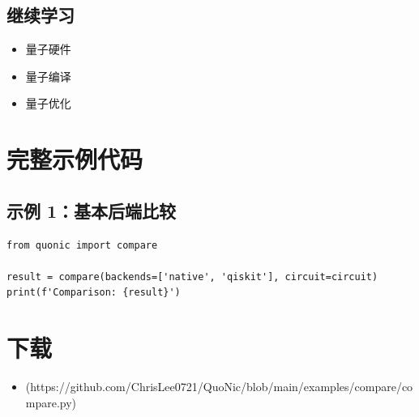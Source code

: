 \documentclass[12pt,a4paper]{article}
\begin{document}
\subsection{继续学习}
\begin{itemize}
  \item 量子硬件
  \item 量子编译
  \item 量子优化
\end{itemize}

\section{完整示例代码}

\subsection{示例 1：基本后端比较}

\begin{verbatim}
from quonic import compare

result = compare(backends=['native', 'qiskit'], circuit=circuit)
print(f'Comparison: {result}')
\end{verbatim}

\section{下载}

\begin{itemize}
  \item [compare.py](https://github.com/ChrisLee0721/QuoNic/blob/main/examples/compare/compare.py)
\end{itemize}
\end{document}
